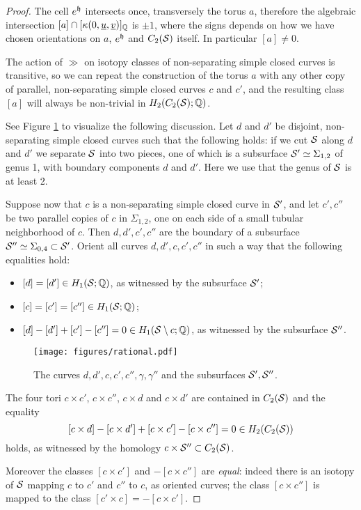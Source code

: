 \begin{proof}
The cell $e^{\tup}$ intersects once, transversely the torus $a$, therefore the
algebraic intersection $[a]\cap[\kappa(0,\uu,\uv)]_{\Q}$ is $\pm 1$,
where the signs depends on how we have chosen orientations on $a$, $e^{\tup}$ and $C_2(\S)$ itself.
In particular $[a]\neq 0$.

The action of $\gg$ on isotopy classes of non-separating simple closed curves is transitive, so we can repeat
the construction of the torus $a$ with any other copy of parallel, non-separating simple closed curves
$c$ and $c'$, and the resulting class $[a]$ will always be non-trivial in $H_2(C_2(\S);\Q)$.

See Figure \ref{fig:rational} to visualize the following discussion.
Let $d$ and $d'$ be disjoint, non-separating simple closed curves such that
the following holds: if we cut $\S$ along $d$ and $d'$ we separate $\S$ into two pieces, one of
which is a subsurface $\S'\simeq\Sigma_{1,2}$ of genus 1, with boundary
components $d$ and $d'$. Here we use that the genus of $\S$ is at least 2.

Suppose now that $c$ is a non-separating simple closed curve in $\S'$,
and let $c',c''$ be two parallel copies of $c$ in $\Sigma_{1,2}$, one on each side of a small tubular
neighborhood of $c$.
Then $d,d',c',c''$ are the boundary of a subsurface $\S''\simeq\Sigma_{0,4}\subset\S'$.
Orient all curves $d,d',c,c',c''$ in such a way that the following equalities hold:
\begin{itemize}
 \item $[d]=[d']\in H_1(\S;\Q)$, as witnessed by the subsurface $\S'$;
 \item $[c]=[c']=[c'']\in H_1(\S;\Q)$;
 \item $[d]-[d']+[c']-[c'']=0\in H_1(\S\setminus c;\Q)$, as witnessed by the subsurface $\S''$.
\end{itemize}

\begin{figure}\centering
 \texttt{[image: figures/rational.pdf]}
 \caption{The curves $d,d',c,c',c'',\gamma,\gamma''$ and the subsurfaces $\S',\S''$.}
\label{fig:rational}
\end{figure}

The four tori $c\times c'$, $c\times c''$, $c\times d$ and $c\times d'$ are contained in $C_2(\S)$
and the equality
\[
 [c\times d]-[c\times d']+[c\times c']-[c\times c'']=0\in H_2(C_2(\S))
\]
holds, as witnessed by the homology $c\times \S''\subset C_2(\S)$.

Moreover the classes $[c\times c']$ and $-[c\times c'']$ are \emph{equal}:
indeed there is an isotopy of $\S$ mapping $c$ to $c'$ and $c''$ to $c$,
as oriented curves; the class $[c\times c'']$ is mapped to the class $[c'\times c]=-[c\times c']$.


\end{proof}
